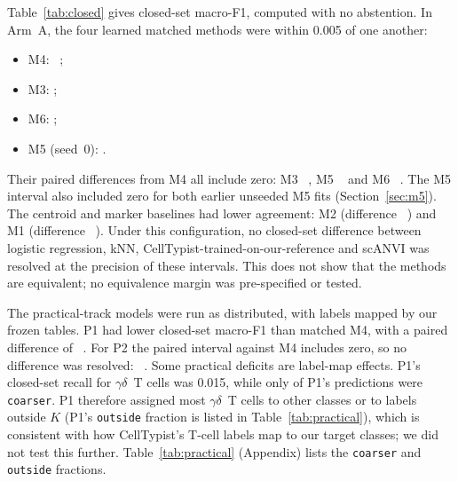\documentclass[11pt]{article}
\newcommand{\gd}{$\gamma\delta$~T}
\begin{document}
Table~\ref{tab:closed} gives closed-set macro-F1, computed with no abstention. In Arm~A, the four learned matched methods were within 0.005 of one another:
\begin{itemize}
\item M4: ~;
\item M3: ;
\item M6: ;
\item M5 (seed~0): .
\end{itemize}
Their paired differences from M4 all include zero: M3 ~, M5 ~ and M6 ~. The M5 interval also included zero for both earlier unseeded M5 fits (Section~\ref{sec:m5}). The centroid and marker baselines had lower agreement: M2  (difference ~) and M1  (difference ~). Under this configuration, no closed-set difference between logistic regression, kNN, CellTypist-trained-on-our-reference and scANVI was resolved at the precision of these intervals. This does not show that the methods are equivalent; no equivalence margin was pre-specified or tested.

The practical-track models were run as distributed, with labels mapped by our frozen tables. P1 had lower closed-set macro-F1 than matched M4, with a paired difference of ~. For P2 the paired interval against M4 includes zero, so no difference was resolved: ~. Some practical deficits are label-map effects. P1's closed-set recall for \gd{} cells was 0.015, while only  of P1's predictions were \texttt{coarser}. P1 therefore assigned most \gd{} cells to other classes or to labels outside $K$ (P1's \texttt{outside} fraction is listed in Table~\ref{tab:practical}), which is consistent with how CellTypist's T-cell labels map to our target classes; we did not test this further. Table~\ref{tab:practical} (Appendix) lists the \texttt{coarser} and \texttt{outside} fractions.
\end{document}
